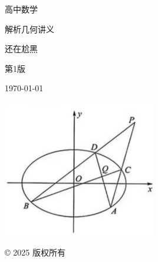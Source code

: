 \begin{titlepage}
    \centering
    \vspace*{0.5cm}
    
    {\fontsize{80}{80}\selectfont\songti 高中数学 \par}
    \vspace{0.1cm} %
    
    {\fontsize{65}{65}\selectfont\songti 解析几何讲义 \par}
    \vspace{1cm} %
    
    {\Large {} 还在尬黑 \par}
    \vspace{0.1cm}
    
    {\Large {} 第1版 \par}
    \vspace{0.1cm}
    
    {\Large {} \today \par}
    \vspace{0.1cm}
    
    \includegraphics[width=0.5\textwidth]{flg/example.png} %
    \par\vspace{1cm}
    {\small \copyright{} 2025 版权所有}
\end{titlepage}
